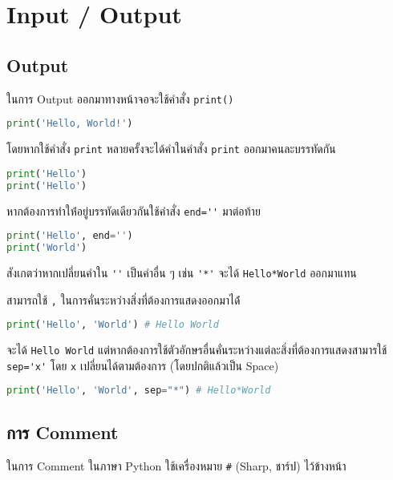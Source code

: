 \section{Input / Output}

\subsection{Output}

ในการ Output ออกมาทางหน้าจอจะใช้คำสั่ง \verb|print()|

\begin{lstlisting}[language=Python]
print('Hello, World!')
\end{lstlisting}

โดยหากใช้คำสั่ง \verb|print| หลายครั้งจะได้คำในคำสั่ง \verb|print| ออกมาคนละบรรทัดกัน

\begin{lstlisting}[language=Python]
print('Hello')
print('Hello')
\end{lstlisting}

หากต้องการทำให้่อยู่บรรทัดเดียวกันใช้คำสั่ง \verb|end=''| มาต่อท้าย

\begin{lstlisting}[language=Python]
print('Hello', end='')
print('World')
\end{lstlisting}

สังเกตว่าหากเปลี่ยนคำใน \verb|''| เป็นคำอื่น ๆ เช่น \verb|'*'| จะได้ \verb|Hello*World| ออกมาแทน

สามารถใช้ \verb|,| ในการคั่นระหว่างสิ่งที่ต้องการแสดงออกมาได้่

\begin{lstlisting}[language=Python]
print('Hello', 'World') # Hello World
\end{lstlisting}

จะได้ \verb|Hello World| แต่หากต้องการใช้ตัวอักษรอื่นคั่นระหว่างแต่ละสิ่งที่ต้องการแสดงสามารใช้ \verb|sep='x'| โดย \verb|x| เปลี่ยนได้ตามต้องการ (โดยปกติแล้วเป็น Space)

\begin{lstlisting}[language=Python]
print('Hello', 'World', sep="*") # Hello*World
\end{lstlisting}

\subsection{การ Comment}

ในการ Comment ในภาษา Python ใช้เครื่องหมาย \verb|#| (Sharp, ชาร์ป) ไว้ข้างหน้า

